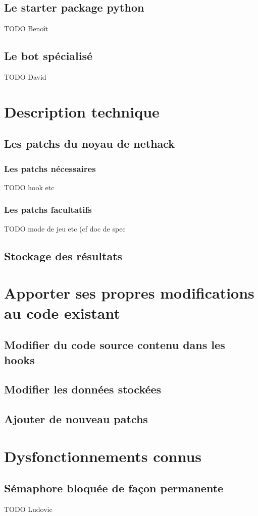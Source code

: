 \documentclass[10pt,a4paper]{report}
\begin{document}
\section{Le starter package python}
TODO Benoît
\section{Le bot spécialisé}
TODO David

\chapter{Description technique}
\section{Les patchs du noyau de nethack}
\subsection{Les patchs nécessaires}
TODO hook etc
\subsection{Les patchs facultatifs}
TODO mode de jeu etc (cf doc de spec
\section{Stockage des résultats}

\chapter{Apporter ses propres modifications au code existant}
\section{Modifier du code source contenu dans les hooks}
\section{Modifier les données stockées}
\section{Ajouter de nouveau patchs}

\chapter{Dysfonctionnements connus}
\section{Sémaphore bloquée de façon permanente}
TODO Ludovic
\end{document}

